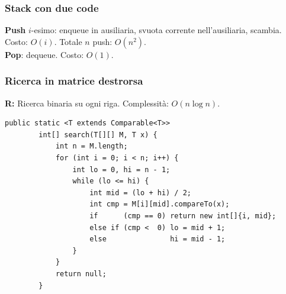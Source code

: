 \documentclass[a4paper, 11pt]{article}
\theoremstyle{definition}
\theoremstyle{remark}
\theoremstyle{remark}
\begin{document}
	\subsubsection*{Stack con due code}
	\noindent\textbf{Push} $i$-esimo: enqueue in ausiliaria, svuota corrente
	nell'ausiliaria, scambia. Costo: $O(i)$. Totale $n$ push: $O(n^2)$.\\
	\noindent\textbf{Pop}: dequeue. Costo: $O(1)$.
	
	\subsubsection*{Ricerca in matrice destrorsa}
	\textbf{R:} Ricerca binaria su ogni riga. Complessità: $O(n\log n)$.
	\begin{lstlisting}[basicstyle=\ttfamily\scriptsize]
		public static <T extends Comparable<T>>
		int[] search(T[][] M, T x) {
			int n = M.length;
			for (int i = 0; i < n; i++) {
				int lo = 0, hi = n - 1;
				while (lo <= hi) {
					int mid = (lo + hi) / 2;
					int cmp = M[i][mid].compareTo(x);
					if      (cmp == 0) return new int[]{i, mid};
					else if (cmp <  0) lo = mid + 1;
					else               hi = mid - 1;
				}
			}
			return null;
		}
	\end{lstlisting}
	
\end{document}
